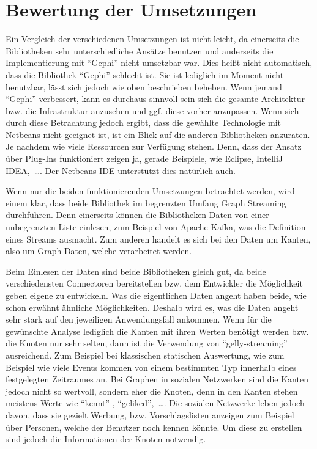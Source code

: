\section{Bewertung der Umsetzungen}
Ein Vergleich der verschiedenen Umsetzungen ist nicht leicht, da einerseits die
Bibliotheken sehr unterschiedliche Ansätze benutzen und anderseits die
Implementierung mit \enquote{Gephi} nicht umsetzbar war. Dies heißt nicht
automatisch, dass die Bibliothek \enquote{Gephi} schlecht ist. Sie ist lediglich
im Moment nicht benutzbar, lässt sich jedoch wie oben beschrieben beheben.
Wenn jemand \enquote{Gephi} verbessert, kann es durchaus sinnvoll sein sich die
gesamte Architektur bzw. die Infrastruktur anzusehen und ggf. diese vorher
anzupassen. Wenn sich durch diese Betrachtung jedoch ergibt, dass die gewählte
Technologie mit Netbeans nicht geeignet ist, ist ein Blick auf die
anderen Bibliotheken anzuraten. Je nachdem wie viele Ressourcen zur
Verfügung stehen. Denn, dass der Ansatz über Plug-Ins funktioniert zeigen ja,
gerade Beispiele, wie Eclipse, IntelliJ IDEA,~\dots . Der Netbeans \gls{IDE}
unterstützt dies natürlich auch.

Wenn nur die beiden funktionierenden Umsetzungen betrachtet werden, wird einem
klar, dass beide Bibliothek im begrenzten Umfang Graph Streaming durchführen.
Denn einerseits können die Bibliotheken Daten von einer unbegrenzten Liste
einlesen, zum Beispiel von Apache Kafka, was die Definition eines Streams
ausmacht. Zum anderen handelt es sich bei den Daten um Kanten, also um
Graph-Daten, welche verarbeitet werden.

Beim Einlesen der Daten sind beide Bibliotheken gleich gut, da beide
verschiedensten Connectoren bereitstellen bzw. dem Entwickler die Möglichkeit
geben eigene zu entwickeln. Was die eigentlichen Daten angeht haben beide, wie
schon erwähnt ähnliche Möglichkeiten. Deshalb wird es, was die Daten angeht sehr
stark auf den jeweiligen Anwendungsfall ankommen. Wenn für die gewünschte Analyse
lediglich die Kanten mit ihren Werten benötigt werden bzw. die Knoten nur sehr
selten, dann ist die Verwendung von \enquote{gelly-streaming} ausreichend. Zum
Beispiel bei klassischen statischen Auswertung, wie zum Beispiel wie viele Events
kommen von einem bestimmten Typ innerhalb eines festgelegten Zeitraumes an. Bei
Graphen in sozialen Netzwerken sind die Kanten jedoch nicht so wertvoll, sondern
eher die Knoten, denn in den Kanten stehen meistens Werte wie \enquote{kennt}
, \enquote{geliked},~\dots . Die sozialen Netzwerke leben jedoch davon, dass sie
gezielt Werbung, bzw. Vorschlagslisten anzeigen zum Beispiel über Personen,
welche der Benutzer noch kennen könnte. Um diese zu erstellen sind jedoch die
Informationen der Knoten notwendig.


